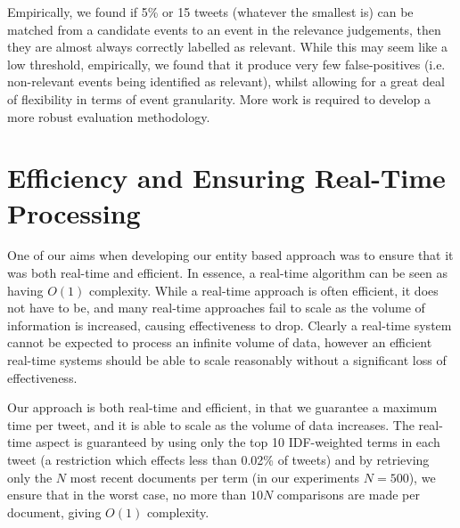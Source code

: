 Empirically, we found if 5\% or 15 tweets (whatever the smallest is) can be matched from a candidate events to an event in the relevance judgements, then they are almost always correctly labelled as relevant.
While this may seem like a low threshold, empirically, we found that it produce very few false-positives (i.e. non-relevant events being identified as relevant), whilst allowing for a great deal of flexibility in terms of event granularity.
More work is required to develop a more robust evaluation methodology.

\section{Efficiency and Ensuring Real-Time Processing}
One of our aims when developing our entity based approach was to ensure that it was both real-time and efficient. In essence, a real-time algorithm can be seen as having \(O(1)\) complexity. While a real-time approach is often efficient, it does not have to be, and many real-time approaches fail to scale as the volume of information is increased, causing effectiveness to drop. Clearly a real-time system cannot be expected to process an infinite volume of data, however an efficient real-time systems should be able to scale reasonably without a significant loss of effectiveness.

Our approach is both real-time and efficient, in that we guarantee a maximum time per tweet, and it is able to scale as the volume of data increases.
The real-time aspect is guaranteed by using only the top 10 IDF-weighted terms in each tweet (a restriction which effects less than 0.02\% of tweets) and by retrieving only the \(N\) most recent documents per term (in our experiments \(N = 500\)), we ensure that in the worst case, no more than \(10N\) comparisons are made per document, giving \(O(1)\) complexity.

